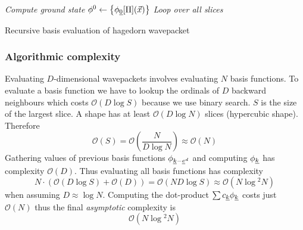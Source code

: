 \documentclass{article}
\begin{document}
\begin{algorithm}[H]
  \emph{Compute ground state}\;
  \(\phi^0 \gets \left\{ \phi_{\underline{0}}[\Pi](\vec{x}) \right\} \)\;
  \emph{Loop over all slices}\;
  \caption{Recursive basis evaluation of hagedorn wavepacket}
\end{algorithm}

\subsubsection{Algorithmic complexity} \label{sec:hawp_eval_runtime_complexity}
Evaluating \(D\)-dimensional wavepackets involves evaluating \(N\) basis functions.
To evaluate a basis function we have to lookup the ordinals of \(D\)
backward neighbours which costs \(\mathcal{O}(D \log{}S)\) because we use binary search.
\(S\) is the size of the largest slice. A shape has at least \(\mathcal{O}(D\log{}N)\)
slices (hypercubic shape). Therefore
\[
  \mathcal{O}(S)=\mathcal{O}(\frac{N}{D\log{}N}) \approx \mathcal{O}(N)
\]
Gathering values of previous basis functions \(\phi_{\underline{k}-\underline{e}^d}\) and computing \(\phi_{\underline{k}}\)
has complexity \(\mathcal{O}(D)\).
Thus evaluating all basis functions has complexity
\[
  N \cdot \left(\mathcal{O}(D\log{}S) + \mathcal{O}(D)\right) =
  \mathcal{O}(ND\log{}S) \approx
  \mathcal{O}(N\log{}^2 N)
\]
when assuming \(D \approx \log{}N\).
Computing the dot-product \(\sum c_{\underline{k}}\phi_{\underline{k}}\) costs just \(\mathcal{O}(N)\)
thus the final \emph{asymptotic} complexity is
\begin{equation}
  \label{eq:hawp_eval_complexity}
  \mathcal{O}(N\log{}^2N)
\end{equation}
\end{document}

